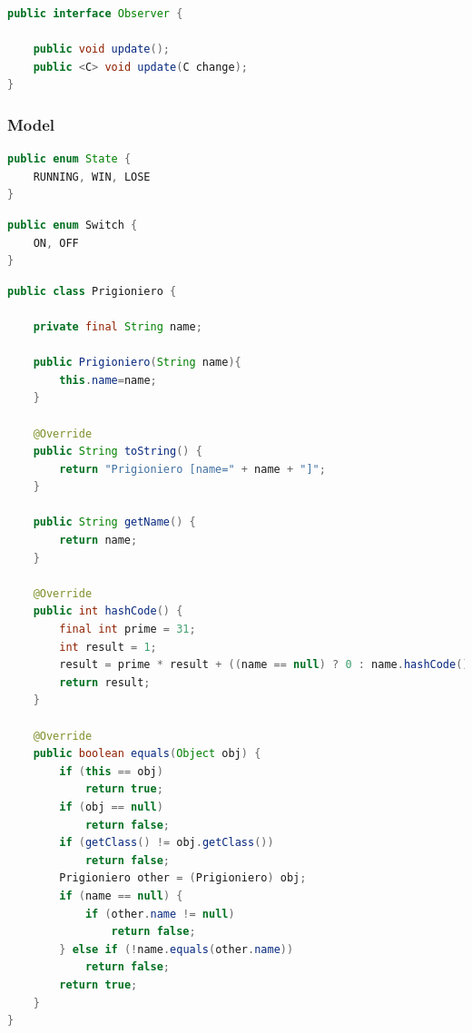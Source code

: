\documentclass{article}
\begin{document}
\begin{lstlisting}[language=Java]
public interface Observer {

	public void update();
	public <C> void update(C change);
}
\end{lstlisting}


\subsubsection{Model}

\begin{lstlisting}[language=Java]
public enum State {
	RUNNING, WIN, LOSE
}
\end{lstlisting}

\begin{lstlisting}[language=Java]
public enum Switch {
	ON, OFF
}
\end{lstlisting}

\begin{lstlisting}[language=Java]
public class Prigioniero {

	private final String name;
	
	public Prigioniero(String name){
		this.name=name;
	}

	@Override
	public String toString() {
		return "Prigioniero [name=" + name + "]";
	}

	public String getName() {
		return name;
	}
	
	@Override
	public int hashCode() {
		final int prime = 31;
		int result = 1;
		result = prime * result + ((name == null) ? 0 : name.hashCode());
		return result;
	}

	@Override
	public boolean equals(Object obj) {
		if (this == obj)
			return true;
		if (obj == null)
			return false;
		if (getClass() != obj.getClass())
			return false;
		Prigioniero other = (Prigioniero) obj;
		if (name == null) {
			if (other.name != null)
				return false;
		} else if (!name.equals(other.name))
			return false;
		return true;
	}
}
\end{lstlisting}
\end{document}
